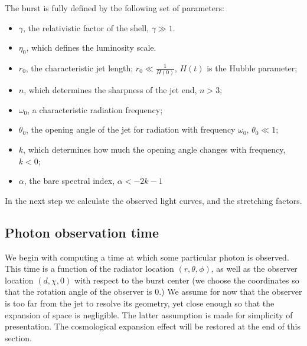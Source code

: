 \documentclass[manuscript]{aastex}
\begin{document}
The burst is fully defined by the following set of parameters:
\begin{itemize}
\item{$\gamma$, the relativistic factor of the shell, $\gamma \gg 1$.}
\item{$\eta_0$, which defines the luminosity scale.}
\item{$r_0$, the characteristic jet length; $r_0 \ll \frac{1}{H\left(0\right)}$, $H\left(t\right)$ is the Hubble parameter;}
\item{$n$, which determines the sharpness of the jet end, $n > 3$;}
\item{$\omega_0$, a characteristic radiation frequency;}
\item{$\theta_0$, the opening angle of the jet for radiation with frequency $\omega_0$, $\theta_0 \ll 1$;}
\item{$k$, which determines how much the opening angle changes with frequency, $k < 0$;}
\item{$\alpha$, the bare spectral index, $\alpha < -2k - 1$}
\end{itemize}

In the next step we calculate the observed light curves, and the
stretching factors.

\subsection{Photon observation time}

We begin with computing a time at which some particular photon is
observed. This time is a function of the radiator location $\left(r,
\theta, \phi\right)$, as well as the observer location $\left(d, \chi,
0\right)$ with respect to the burst center (we choose the coordinates
so that the rotation angle of the observer is $0$.) We assume for now
that the observer is too far from the jet to resolve its geometry, yet
close enough so that the expansion of space is negligible. The latter
assumption is made for simplicity of presentation. The cosmological
expansion effect will be restored at the end of this section.
\end{document}
